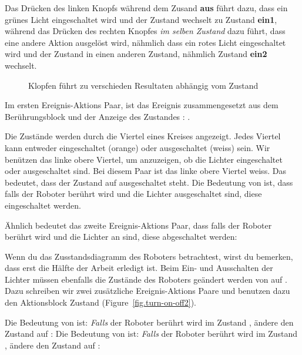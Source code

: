 Das Drücken des linken Knopfs während dem Zusand \textbf{aus} führt dazu, dass ein grünes Licht eingeschaltet wird und der Zustand wechselt zu Zustand \textbf{ein1}, während das Drücken des rechten Knopfes  \emph{im selben Zustand} dazu führt, dass eine andere Aktion ausgelöst wird, nähmlich dass ein rotes Licht eingeschaltet wird und der Zustand in einen anderen Zustand, nähmlich Zustand \textbf{ein2} wechselt.

\begin{figure}
	\hfill
	\caption{Klopfen führt zu verschieden Resultaten abhängig vom Zustand}
	\label{fig.turn-on-off}
\end{figure}


Im ersten Ereignis-Aktions Paar, ist das Ereignis zusammengesetzt aus dem Berührungsblock und der Anzeige des Zustandes : 
.

Die Zustände werden durch die Viertel eines Kreises angezeigt. Jedes Viertel kann entweder eingeschaltet (orange) oder ausgeschaltet (weiss) sein. Wir benützen das linke obere Viertel, um anzuzeigen, ob die Lichter eingeschaltet oder ausgeschaltet sind. Bei diesem Paar ist das linke obere Viertel weiss. Das bedeutet, dass der Zustand auf ausgeschaltet steht. Die Bedeutung von
ist, dass falls der Roboter berührt wird und die Lichter ausgeschaltet sind, diese eingeschaltet werden.

Ähnlich bedeutet das zweite Ereignis-Aktions Paar, dass falls der Roboter berührt wird und die Lichter an sind, diese abgeschaltet werden:

Wenn du das Zusstandsdiagramm des Roboters betrachtest, wirst du bemerken, dass erst die Hälfte der Arbeit erledigt ist. Beim Ein- und Ausschalten der Lichter müssen ebenfalls die Zustände des Roboters geändert werden von  auf  . Dazu schreiben wir zwei zusätzliche Ereignis-Aktions Paare und benutzen dazu den Aktionsblock Zustand  (Figure~\ref{fig.turn-on-off2}).



Die Bedeutung von
ist: \emph{Falls} der Roboter berührt wird
im Zustand , ändere den Zustand auf :
Die Bedeutung von
ist: \emph{Falls} der Roboter berührt wird im Zustand , ändere den Zustand auf : 

